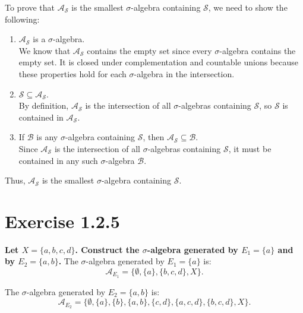 \documentclass[11pt]{article}
\begin{document}
To prove that \(\mathcal{A}_\mathcal{S}\) is the smallest \(\sigma\)-algebra containing \(\mathcal{S}\), we need to show the following:
\begin{enumerate}
    \item \(\mathcal{A}_\mathcal{S}\) is a \(\sigma\)-algebra. \\
    We know that \(\mathcal{A}_\mathcal{S}\) contains the empty set since every \(\sigma\)-algebra contains the empty set. It is closed under complementation and countable unions because these properties hold for each \(\sigma\)-algebra in the intersection.

    \item \(\mathcal{S} \subseteq \mathcal{A}_\mathcal{S}\). \\
    By definition, \(\mathcal{A}_\mathcal{S}\) is the intersection of all \(\sigma\)-algebras containing \(\mathcal{S}\), so \(\mathcal{S}\) is contained in \(\mathcal{A}_\mathcal{S}\).

    \item If \(\mathcal{B}\) is any \(\sigma\)-algebra containing \(\mathcal{S}\), then \(\mathcal{A}_\mathcal{S} \subseteq \mathcal{B}\). \\
    Since \(\mathcal{A}_\mathcal{S}\) is the intersection of all \(\sigma\)-algebras containing \(\mathcal{S}\), it must be contained in any such \(\sigma\)-algebra \(\mathcal{B}\).
    
\end{enumerate}

Thus, \(\mathcal{A}_\mathcal{S}\) is the smallest \(\sigma\)-algebra containing \(\mathcal{S}\).

\section*{Exercise 1.2.5}
\textbf{\large Let \(X = \{a, b, c, d\}\). Construct the \(\sigma\)-algebra generated by \(E_1 = \{{a}\}\) and by \(E_2 = \{{a}, {b}\}\).}
The \(\sigma\)-algebra generated by \(E_1 = \{a\}\) is:
\[\mathcal{A}_{E_1} = \{\emptyset, \{a\}, \{b, c, d\}, X\}.\]

The \(\sigma\)-algebra generated by \(E_2 = \{a, b\}\) is:
\[\mathcal{A}_{E_2} = \{\emptyset, \{a\}, \{b\}, \{a, b\}, \{c, d\}, \{a, c, d\}, \{b, c, d\}, X\}.\]
\end{document}

